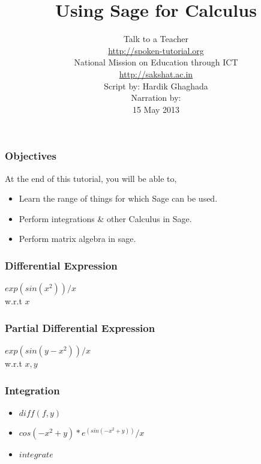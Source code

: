\documentclass[17pt]{beamer}
\author[FOSSEE]{}
\institute[IIT Bombay]{}
\date[]{}
\begin{document}
\sffamily \bfseries
\title
[Using Sage for Calculus]
{Using Sage for Calculus}
\author
[FOSSEE]
{\small Talk to a Teacher\\{\color{blue}\url{http://spoken-tutorial.org}}\\National Mission on Education
 through ICT\\{\color{blue}\url{http://sakshat.ac.in}} \\ [0.8cm]Script by: Hardik Ghaghada \\Narration by:  \\ [0.7cm]
{\small 15 May 2013}}

\begin{frame}
   \titlepage
\end{frame}
\begin{frame}
\frametitle{Objectives}
 At the end of this tutorial, you will be able to,
\begin{itemize}
\item Learn the range of things for which Sage can be used.
\item Perform integrations \& other Calculus in Sage.
\item Perform matrix algebra in sage.
\end{itemize}
\end{frame}
\begin{frame}
\frametitle{Differential Expression}
$exp(sin(x^2))/x$\\
w.r.t $x$
\end{frame}
\begin{frame}
\frametitle{Partial Differential Expression}
$exp(sin(y - x^2))/x$\\
w.r.t $x, y$
\end{frame}
\begin{frame}
\frametitle{Integration}
\begin{itemize}
\item $diff(f, y)$\\
\item $cos(-x^2 + y)*e^(sin(-x^2 + y))/x$\\
\item $integrate$
\end{itemize}
\end{frame}
\end{document}
